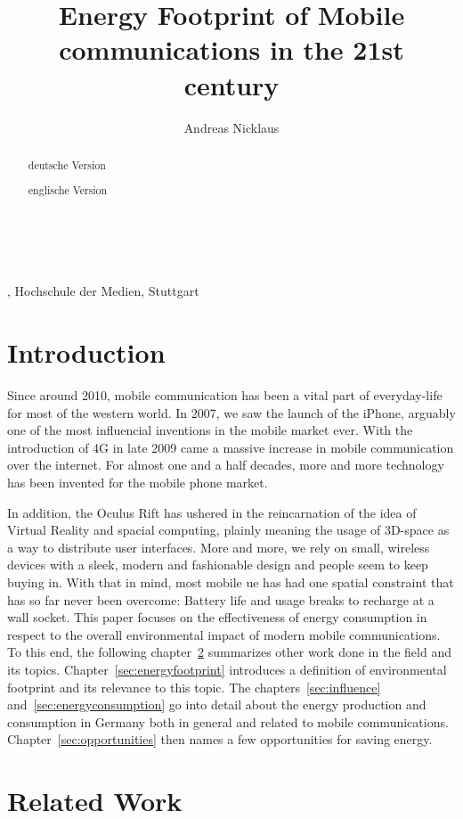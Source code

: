 \documentclass[11pt,a4paper]{article}
\title{Energy Footprint of Mobile communications in the 21st century}
\author{Andreas Nicklaus}
\makeatletter
\renewcommand\maketitle{
{\raggedright
\begin{center}
{\Large \bfseries \@title}\\[2ex] 
\@author\\[1ex] 
\@date, Hochschule der Medien, Stuttgart\\[1ex]
\end{center}}}
\makeatother
\begin{document}
\maketitle

\begin{abstract}
  deutsche Version
\end{abstract}


\begin{abstract}
  englische Version
\end{abstract}

\tableofcontents

\section{Introduction}\label{sec:intro}
Since around 2010, mobile communication has been a vital part of everyday-life for most of the western world.
In 2007, we saw the launch of the iPhone, arguably one of the most influencial inventions in the mobile market ever.
With the introduction of 4G in late 2009 came a massive increase in mobile communication over the internet.
For almost one and a half decades, more and more technology has been invented for the mobile phone market.

In addition, the Oculus Rift has ushered in the reincarnation of the idea of Virtual Reality and spacial computing, plainly meaning the usage of 3D-space as a way to distribute user interfaces.
More and more, we rely on small, wireless devices with a sleek, modern and fashionable design and people seem to keep buying in. 
With that in mind, most mobile \acrfull{ue} has had one spatial constraint that has so far never been overcome: Battery life and usage breaks to recharge at a wall socket.
This paper focuses on the effectiveness of energy consumption in respect to the overall environmental impact of modern mobile communications.
To this end, the following chapter~\ref{sec:relatedwork} summarizes other work done in the field and its topics.
Chapter~\ref{sec:energyfootprint} introduces a definition of environmental footprint and its relevance to this topic.
The chapters~\ref{sec:influence} and~\ref{sec:energyconsumption} go into detail about the energy production and consumption in Germany both in general and related to mobile communications.
Chapter~\ref{sec:opportunities} then names a few opportunities for saving energy.

\section{Related Work}\label{sec:relatedwork}
\end{document}
